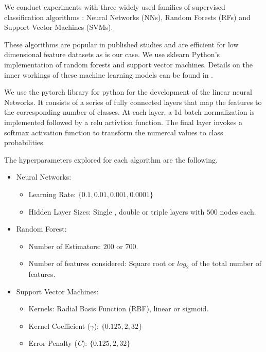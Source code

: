\documentclass{aastex62}
\begin{document}
We conduct experiments with three widely used families of supervised classification 
algorithms \citep{skysurvey, 1601.03931}: Neural Networks (NNs), Random Forests (RFs) and Support
Vector Machines (SVMs). 

These algorithms are popular in published studies and are efficient 
for low dimensional feature datasets as is our case. 
We use sklearn \citep{1201.0490} Python's implementation of random forests and support vector machines. 
Details on the inner workings of these machine learning models can be found in \cite{9780387848570}.

We use the pytorch library for python for the development of the linear neural Networks. It consists of a series of fully connected layers that map the features to the corresponding number of classes. At each layer, a 1d batch normalization is implemented followed by a relu activtion function. The final layer invokes a softmax activation function to transform the numercal values to class probabilities.

The hyperparameters explored for each algorithm are the
following. 

\begin{itemize}
\item Neural Networks:
\begin{itemize}
\item Learning Rate: $\{0.1,0.01,0.001,0.0001\}$
\item Hidden Layer Sizes: Single , double or triple layers with $500$ nodes each.
\end{itemize}

\item Random Forest:
\begin{itemize}
    \item Number of Estimators: $200$ or $700$.
    \item Number of features considered: Square root or $log_2$ of the total number of features.
\end{itemize}

\item Support Vector Machines:
\begin{itemize}
    \item Kernels: Radial Basis Function (RBF), linear or sigmoid.
    \item Kernel Coefficient ($\gamma$):  
      $\{0.125, 2, 32\}$
    \item Error Penalty (\textit{C}): $\{0.125, 2, 32\}$
\end{itemize}
\end{itemize}
\end{document}
